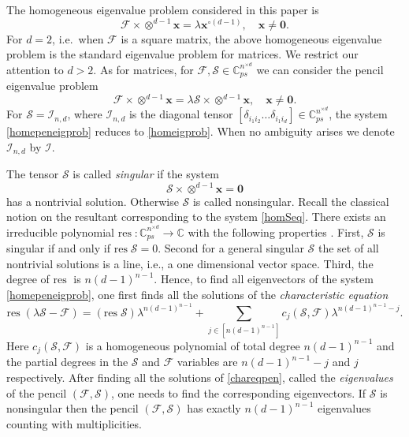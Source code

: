 \documentclass{amsart}
\newcommand{\C}{\mathbb{C}}
\newcommand{\x}{\mathbf{x}}
\newcommand{\0}{\mathbf{0}}
\newcommand{\1}{\mathbf{1}}
\newcommand{\cF}{\mathcal{F}}
\newcommand{\cI}{\mathcal{I}}
\newcommand{\cS}{\mathcal{S}}
\newcommand{\res}{\mathrm{res\;}}
\theoremstyle{remark}
\numberwithin{equation}{section} %
\begin{document}
The homogeneous eigenvalue problem considered in this paper is
 \begin{equation}\label{homeigprob}
 \cF\times \otimes^{d-1}\x=\lambda\x^{\circ (d-1)}, \quad \x\ne \0.
 \end{equation}
 For $d=2$, i.e.\ when $\cF$ is a square matrix, the above homogeneous eigenvalue problem is the standard eigenvalue problem for matrices.
 We restrict our attention to $d>2$. As for matrices, for $\cF,\cS\in \C^{n^{\times d}}_{ps}$ we can consider the pencil eigenvalue problem
%
 \begin{equation}\label{homepeneigprob}
 \cF\times \otimes^{d-1} \x=\lambda \cS\times \otimes^{d-1} \x, \quad \x\ne \0.
 \end{equation}
 For $\cS=\cI_{n,d}$, where $\cI_{n,d}$ is the diagonal tensor $[\delta_{i_1i_2}\ldots\delta_{i_1i_d}]\in \C^{n^{\times d}}_{ps}$, the system
 \eqref{homepeneigprob} reduces to \eqref{homeigprob}.  When no ambiguity arises we denote $\cI_{n,d}$ by $\cI$.

The tensor $\cS$ is called \emph{singular} if the system
 \begin{equation}\label{homSeq}
 \cS\times\otimes^{d-1}\x=\0
 \end{equation}
 has a nontrivial solution.  Otherwise $\cS$ is called nonsingular.  Recall the classical notion on the resultant corresponding
 to the system \eqref{homSeq}.  There exists an irreducible polynomial $\res :\C^{n^{\times d}}_{ps}\to \C$ with the following properties
 \cite[Chapter 13]{GKZ}.  First, $\cS$ is singular if and only if $\res \cS=0$.  Second for a general singular $\cS$ the set of all nontrivial
 solutions is a line, i.e., a one dimensional vector space.  Third, the degree of $\res $ is $n (d-1)^{n-1}$.
 Hence, to find all eigenvectors of the system \eqref{homepeneigprob},
one first finds all the solutions of the \emph{characteristic equation}
 \begin{equation}\label{chareqpen}
 \res(\lambda\cS-\cF)=(\res \cS)\lambda^{n(d-1)^{n-1}}+\sum_{j\in [n(d-1)^{n-1}]} c_j(\cS,\cF)\lambda^{n(d-1)^{n-1}-j}.
 \end{equation}
 Here $c_j(\cS,\cF)$ is a homogeneous polynomial of total degree $n(d-1)^{n-1}$ and the 
%
%
partial degrees
in the $\cS$ and $\cF$ variables are $n(d-1)^{n-1}-j$ and $j$
 respectively.  After finding all the solutions of \eqref{chareqpen},
called the {\em eigenvalues}
 of the pencil $(\cF,\cS)$, one needs to find the corresponding
 eigenvectors.  If $\cS$ is nonsingular then the pencil $(\cF,\cS)$ has exactly $n(d-1)^{n-1}$ eigenvalues counting with multiplicities.
\end{document}
